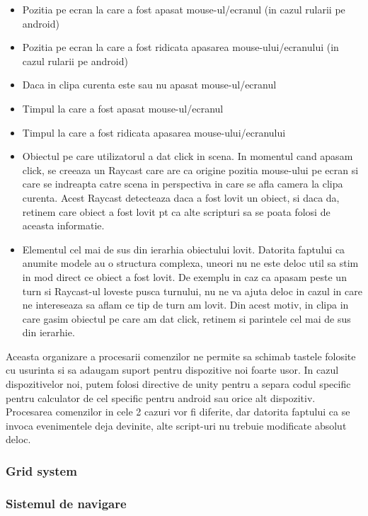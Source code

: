 \documentclass[12pt, a4paper]{article}
\begin{document}
	\begin{itemize}
		\item Pozitia pe ecran la care a fost apasat mouse-ul/ecranul (in cazul rularii pe android)
		\item Pozitia pe ecran la care a fost ridicata apasarea mouse-ului/ecranului (in cazul rularii pe android)
		\item Daca in clipa curenta este sau nu apasat mouse-ul/ecranul
		\item Timpul la care a fost apasat mouse-ul/ecranul
		\item Timpul la care a fost ridicata apasarea mouse-ului/ecranului
		\item Obiectul pe care utilizatorul a dat click in scena. In momentul cand apasam click, se creeaza un Raycast care are ca origine pozitia mouse-ului pe ecran si care se indreapta catre scena in perspectiva in care se afla camera la clipa curenta. Acest Raycast detecteaza daca a fost lovit un obiect, si daca da, retinem care obiect a fost lovit pt ca alte scripturi sa se poata folosi de aceasta informatie.
		\item Elementul cel mai de sus din ierarhia obiectului lovit. Datorita faptului ca anumite modele au o structura complexa, uneori nu ne este deloc util sa stim in mod direct ce obiect a fost lovit. De exemplu in caz ca apasam peste un turn si Raycast-ul loveste pusca turnului, nu ne va ajuta deloc in cazul in care ne intereseaza sa aflam ce tip de turn am lovit. Din acest motiv, in clipa in care gasim obiectul pe care am dat click, retinem si parintele cel mai de sus din ierarhie.
	\end{itemize}

	Aceasta organizare a procesarii comenzilor ne permite sa schimab tastele folosite cu usurinta si sa adaugam suport pentru dispozitive noi foarte usor. In cazul dispozitivelor noi, putem folosi directive de unity pentru a separa codul specific pentru calculator de cel specific pentru android sau orice alt dispozitiv. Procesarea comenzilor in cele 2 cazuri vor fi diferite, dar datorita faptului ca se invoca evenimentele deja devinite, alte script-uri nu trebuie modificate absolut deloc.
	
	\subsubsection{Grid system}
	
	\subsubsection{Sistemul de navigare}
	
\end{document}
